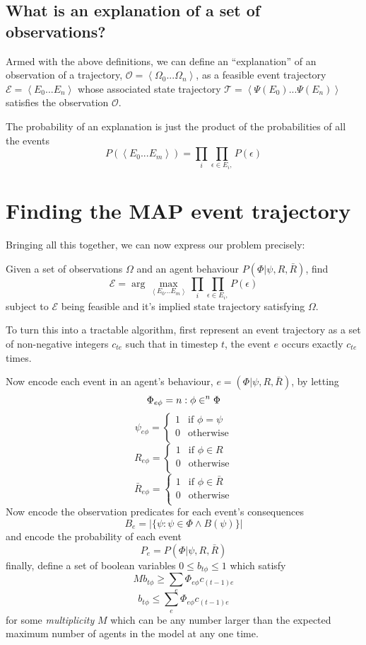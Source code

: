 \documentclass{article}
\begin{document}
\subsection{What is an explanation of a set of observations?}

Armed with the above definitions, we can define an ``explanation'' of an observation of a trajectory, $\mathcal{O} = \left<\Omega_0...\Omega_n\right>$, as a feasible event trajectory $\mathcal{E} = \left<E_0...E_n\right>$ whose associated state trajectory $\mathcal{T} = \left<\Psi(E_0)...\Psi(E_n)\right>$ satisfies the observation $\mathcal{O}$.

The probability of an explanation is just the product of the probabilities of all the events
\[
P(\left<E_0...E_m\right>) = \prod_{i}\prod_{\epsilon\in E_i, }P(\epsilon)
\]

\section{Finding the MAP event trajectory}

Bringing all this together, we can now express our problem precisely:

Given a set of observations $\Omega$ and an agent behaviour $P(\Phi|\psi,R,\bar{R})$, find
\[
\mathcal{E} = \arg\max_{\left<E_0...E_m\right>}\prod_{i}\prod_{\epsilon\in E_i, }P(\epsilon)
\]
subject to $\mathcal{E}$ being feasible and it's implied state trajectory satisfying $\Omega$.

To turn this into a tractable algorithm, first represent an event trajectory as a set of non-negative integers $c_{te}$ such that in timestep $t$, the event $e$ occurs exactly $c_{te}$ times.

Now encode each event in an agent's behaviour, $e = (\Phi|\psi,R,\bar{R})$, by letting 
\[
\Phi_{e\phi} = n: \phi \in^n \Phi\\
\]
\[
\psi_{e\phi} = 
\begin{cases}
1&\text{if } \phi = \psi\\
0&\text{otherwise}\\
\end{cases}
\]
\[
R_{e\phi} =
\begin{cases}
1&\text{if } \phi \in R\\
0&\text{otherwise}\\
\end{cases}
\]
\[
\bar{R}_{e\phi} =
\begin{cases}
1&\text{if } \phi \in \bar{R}\\
0&\text{otherwise}\\
\end{cases}
\]
Now encode the observation predicates for each event's consequences
\[
B_e = |\{\psi: \psi\in\Phi \wedge B(\psi)\}|
\]
and encode the probability of each event
\[
P_e = P(\Phi|\psi,R,\bar{R})
\]
finally, define a set of boolean variables $0 \le b_{t\phi} \le 1$ which satisfy
\[
Mb_{t\phi} \ge \sum_e  \Phi_{e\phi}c_{(t-1)e}
\]
\[
b_{t\phi} \le \sum_e  \Phi_{e\phi}c_{(t-1)e}
\]
for some \textit{multiplicity} $M$ which can be any number larger than the expected maximum number of agents in the model at any one time.
\end{document}
